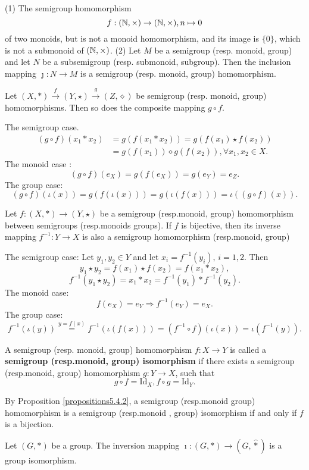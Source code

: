 \begin{remark}
    \quad
    \newline
    (1) The semigroup homomorphism
    $$f:(\mathbb{N}, \times)\rightarrow (\mathbb{N}, \times), n\mapsto 0$$
    of two monoids, but is not a monoid homomorphism, and its image is $\{0\}$,  which is not a submonoid of $(\mathbb{N}, \times)$.
    \newline
    (2) Let $M$ be a semigroup (resp. monoid, group) and let $N$ be a subsemigroup (resp. submonoid, subgroup). Then the inclusion mapping $\jmath :N\rightarrow M$ is a semigroup (resp. monoid,  group) homomorphism.
\end{remark}
\begin{propositionenv}\label{propositions5.4.2}
    Let $(X, *)\overset{f}{\rightarrow} (Y, \star)\overset{g}{\rightarrow}(Z, \diamond ) $ be semigroup (resp. monoid,  group) homomorphisms. Then so does the composite mapping $g\circ f$.
\end{propositionenv}
\begin{proofenv}
    The semigroup case.
        \begin{align*}
            (g\circ f)(x_1*x_2) & = g(f(x_1*x_2))  = g(f(x_1)\star f(x_2)) \\
            & = g(f(x_1))\diamond g(f(x_2)), \forall x_1, x_2\in X.
        \end{align*}
    The monoid case :
    $$(g\circ f)(e_X)=g(f(e_X))=g(e_Y)=e_Z.$$
    The group case:
    $$(g\circ f)(\iota(x))=g(f(\iota(x)))=g(\iota(f(x)))=\iota((g\circ f)(x)).$$
\end{proofenv}
\begin{propositionenv}
    Let $f:(X, *)\rightarrow (Y, \star)$ be a semigroup (resp.monoid,  group) homomorphism between semigroups (resp.monoids groups). If $f$ is bijective,  then its inverse mapping $f^{-1}:Y\rightarrow X$ is also a semigroup homomorphism (resp.monoid, group) 
\end{propositionenv}
\begin{proofenv}
    The semigroup case: Let $y_1, y_2\in Y$ and let $x_i=f^{-1}(y_i), \, i=1, 2$. Then 
    $$y_1\star y_2=f(x_1)\star f(x_2)=f(x_1*x_2), $$
    $$f^{-1}(y_1\star y_2)=x_1*x_2=f^{-1}(y_1)*f^{-1}(y_2).$$
    The monoid case:
    $$f(e_X)=e_Y\Rightarrow f^{-1}(e_Y)=e_X.$$
    The group case:
    $$f^{-1}(\iota(y))\overset{y=f(x)}{=}f^{-1}(\iota(f(x)))=(f^{-1}\circ f)(\iota(x))=\iota(f^{-1}(y)).$$
\end{proofenv}
\begin{definitionenv}
    A semigroup (resp. monoid,  group) homomorphism $f:X\rightarrow Y$ is called a \textbf{semigroup (resp.monoid, group) isomorphism} if there exists a semigroup (resp.monoid, group) homomorphism $g:Y\rightarrow X$,  such that 
    $$g\circ f=\mathrm{Id}_X, f\circ g=\mathrm{Id}_Y.$$
\end{definitionenv}
By Proposition \ref{propositions5.4.2},  a semigroup (resp.monoid group) homomorphism is a semigroup (resp.monoid , group) isomorphism if and only if $f$ is a bijection.
\begin{propositionenv}
    Let $(G, *)$ be a group. The inversion mapping $\imath :(G, *)\rightarrow(G, \hat{*})$ is a group isomorphism.
\end{propositionenv}
